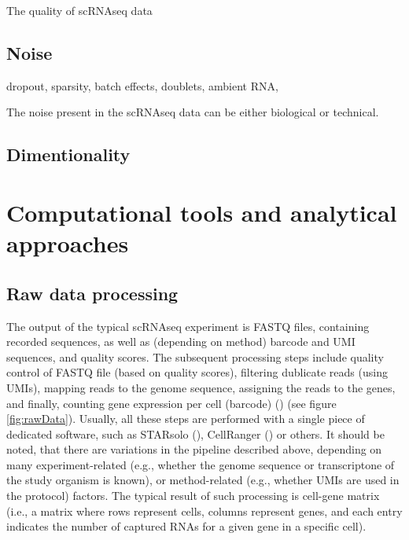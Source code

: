 The quality of scRNAseq data

\subsection{Noise}

dropout, sparsity, batch effects, doublets, ambient RNA,

The noise present in the scRNAseq data can be either biological or technical.

\subsection{Dimentionality}

\section{Computational tools and analytical approaches}

\subsection{Raw data processing}

The output of the typical scRNAseq experiment is FASTQ files, containing recorded sequences,
as well as (depending on method) barcode and UMI sequences, and quality scores.
The subsequent processing steps include quality control of FASTQ file (based on quality scores),
filtering dublicate reads (using UMIs), mapping reads to the genome sequence, assigning the reads to the genes,
and finally, counting gene expression per cell (barcode) (\cite{Heumos2023}) (see figure \ref{fig:rawData}).
Usually, all these steps are performed with a single piece of dedicated software,
such as STARsolo (\cite{Kaminow2021}), CellRanger (\cite{Zheng2017}) or others.
It should be noted, that there are variations in the pipeline described above,
depending on many experiment-related (e.g., whether the genome sequence or transcriptone of the study organism is known),
or method-related (e.g., whether UMIs are used in the protocol) factors.
The typical result of such processing is cell-gene matrix (i.e., a matrix where rows represent cells,
columns represent genes, and each entry indicates the number of captured RNAs for a given gene in a specific cell).

